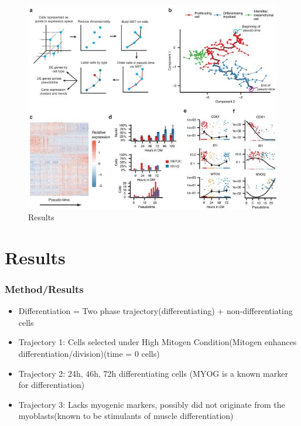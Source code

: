 \documentclass[10pt]{beamer}
\begin{document}
\begin{frame}[fragile]	
	\begin{figure}
		\includegraphics{images/expt2}
		\caption{Results}
	\end{figure}
\end{frame}


\section{Results}

\begin{frame}[fragile]	
	\frametitle{Method/Results}
	\begin{itemize}
		\item Differentiation = Two phase trajectory(differentiating) + non-differentiating cells
		\item Trajectory 1: Cells selected under High Mitogen Condition(Mitogen enhances differentiation/division)(time = 0 cells)
		\item Trajectory 2: 24h, 46h, 72h differentiating cells (MYOG is a known marker for differentiation)
		\item Trajectory 3: Lacks myogenic markers, possibly did not originate from the myoblasts(known to be stimulants of muscle differentiation) 
	\end{itemize}
\end{frame}
\end{document}

